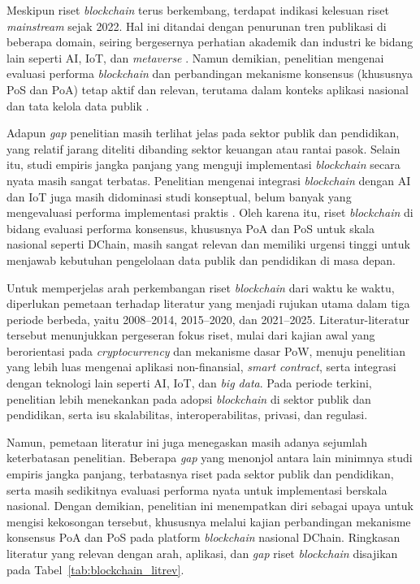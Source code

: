 Meskipun riset \textit{blockchain} terus berkembang, terdapat indikasi kelesuan riset \textit{mainstream} sejak 2022. Hal ini ditandai dengan penurunan tren publikasi di beberapa domain, seiring bergesernya perhatian akademik dan industri ke bidang lain seperti AI, IoT, dan \textit{metaverse} \cite{salah2019, cao2021}. Namun demikian, penelitian mengenai evaluasi performa \textit{blockchain} dan perbandingan mekanisme konsensus (khususnya PoS dan PoA) tetap aktif dan relevan, terutama dalam konteks aplikasi nasional dan tata kelola data publik \cite{li2023, lin2022, johar2021}.

Adapun \textit{gap} penelitian masih terlihat jelas pada sektor publik dan pendidikan, yang relatif jarang diteliti dibanding sektor keuangan atau rantai pasok. Selain itu, studi empiris jangka panjang yang menguji implementasi \textit{blockchain} secara nyata masih sangat terbatas. Penelitian mengenai integrasi \textit{blockchain} dengan AI dan IoT juga masih didominasi studi konseptual, belum banyak yang mengevaluasi performa implementasi praktis \cite{sunny2022, lin2022, agrawal2022}. Oleh karena itu, riset \textit{blockchain} di bidang evaluasi performa konsensus, khususnya PoA dan PoS untuk skala nasional seperti DChain, masih sangat relevan dan memiliki urgensi tinggi untuk menjawab kebutuhan pengelolaan data publik dan pendidikan di masa depan.

Untuk memperjelas arah perkembangan riset \textit{blockchain} dari waktu ke waktu, diperlukan pemetaan terhadap literatur yang menjadi rujukan utama dalam tiga periode berbeda, yaitu 2008--2014, 2015--2020, dan 2021--2025. Literatur-literatur tersebut menunjukkan pergeseran fokus riset, mulai dari kajian awal yang berorientasi pada \textit{cryptocurrency} dan mekanisme dasar PoW, menuju penelitian yang lebih luas mengenai aplikasi non-finansial, \textit{smart contract}, serta integrasi dengan teknologi lain seperti AI, IoT, dan \textit{big data}. Pada periode terkini, penelitian lebih menekankan pada adopsi \textit{blockchain} di sektor publik dan pendidikan, serta isu skalabilitas, interoperabilitas, privasi, dan regulasi.

Namun, pemetaan literatur ini juga menegaskan masih adanya sejumlah keterbatasan penelitian. Beberapa \textit{gap} yang menonjol antara lain minimnya studi empiris jangka panjang, terbatasnya riset pada sektor publik dan pendidikan, serta masih sedikitnya evaluasi performa nyata untuk implementasi berskala nasional. Dengan demikian, penelitian ini menempatkan diri sebagai upaya untuk mengisi kekosongan tersebut, khususnya melalui kajian perbandingan mekanisme konsensus PoA dan PoS pada platform \textit{blockchain} nasional DChain. Ringkasan literatur yang relevan dengan arah, aplikasi, dan \textit{gap} riset \textit{blockchain} disajikan pada Tabel~\ref{tab:blockchain_litrev}.

